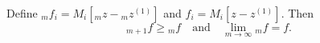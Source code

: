 Define ${}_m f_i = M_i[{}_m z - {}_m z^{(1)}]$ and $f_i = M_i[z - z^{(1)}]$. Then
$${}_{m+1} f \geq {}_m f \quad \text{and} \quad \lim_{m \to \infty} {}_m f = f.$$

